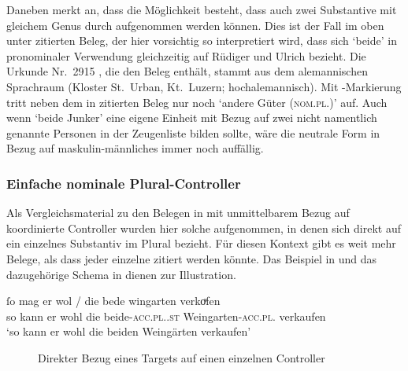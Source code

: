 \label{phsec:jungherren}
Daneben merkt \citet[384]{paul2007} an, dass die Möglichkeit besteht, dass
auch zwei Substantive mit gleichem Genus durch
 aufgenommen werden können. Dies ist der Fall im oben unter
 zitierten Beleg, der hier vorsichtig so
interpretiert wird, dass sich  `beide' in pronominaler Verwendung
gleichzeitig auf Rüdiger und Ulrich bezieht. Die Urkunde Nr.~2915
\autocite[213,14--42]{cao4}, die den Beleg enthält, stammt aus dem
alemannischen Sprachraum (Kloster St.~Urban,
Kt.~Luzern; hochalemannisch). Mit
-Markierung tritt neben dem in  zitierten
Beleg nur noch  `andere Güter (\textsc{nom.pl.\NeutI})'
\autocites(Nr.~2915)[213.27]{cao4} auf. Auch wenn  `beide
Junker' eine eigene Einheit mit Bezug auf zwei nicht namentlich genannte
Personen in der Zeugenliste bilden sollte, wäre die neutrale Form
 in Bezug auf maskulin-männliches  immer noch
auffällig.

\subsubsection{Einfache nominale Plural-Controller}
\label{subsubsec:persplnp}

Als Vergleichsmaterial zu den Belegen in  mit
unmittelbarem Bezug auf koordinierte Controller wurden hier solche aufgenommen,
in denen sich  direkt auf ein einzelnes Substantiv im Plural
bezieht. Für diesen Kontext gibt es weit mehr Belege, als dass jeder einzelne
zitiert werden könnte. Das Beispiel in  und das
dazugehörige Schema in  dienen zur Illustration.

\begin{exe}
\ex \label{ex:beid2snglncao}
	\gll ſo mag er wol / die bede wingarten \textelp{}
			verkoͮfen \\
		so kann er wohl {} die beide-\textsc{acc.pl.\MascI.st}
			Weingarten-\textsc{acc.pl.\MascI} {} verkaufen \\
	\trans `so kann er wohl die beiden Weingärten \textelp{} verkaufen'
		\parencites(Nr.~1221, Zürich, 1290)[484,9]{cao2}
\end{exe}

\begin{figure}
\caption{Direkter Bezug eines Targets auf einen einzelnen Controller}
\label{fig:beid2snglncao}
\end{figure}

